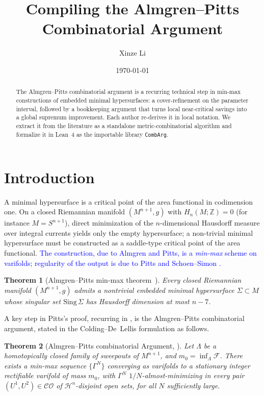 \documentclass[11pt,reqno]{amsart}
\title{Compiling the Almgren--Pitts Combinatorial Argument}
\author{Xinze Li}
\date{\today}
\newcommand{\me}[1]{\textcolor{blue}{#1}}
\newtheorem{theorem}{Theorem}[section]
\theoremstyle{definition}
\newcommand{\CombArg}{\texttt{CombArg}}
\begin{document}
\begin{abstract}
The Almgren--Pitts combinatorial argument is a recurring
technical step in min-max constructions of embedded minimal
hypersurfaces: a cover-refinement on the parameter interval,
followed by a bookkeeping argument that turns local near-critical
savings into a global supremum improvement. Each author
re-derives it in local notation. We extract it from the
literature as a standalone metric-combinatorial algorithm and
formalize it in Lean~4 as the importable library \CombArg.
\end{abstract}

\maketitle

\section{Introduction}
\label{sec:intro}

A minimal hypersurface is a critical point of the area functional
in codimension one. On a closed Riemannian manifold
$(M^{n+1}, g)$ with $H_n(M;\mathbb{Z}) = 0$ (for instance
$M = S^{n+1}$), direct minimization of the $n$-dimensional
Hausdorff measure over integral currents yields only the empty
hypersurface; a non-trivial minimal hypersurface must be
constructed as a saddle-type critical point of the area
functional. \me{The construction, due to Almgren and Pitts, is a
\emph{min-max} scheme on varifolds; regularity of the output is
due to Pitts \cite{Pit81} and Schoen--Simon \cite{SS81}.}

\begin{theorem}[Almgren--Pitts min-max theorem~\cite{Pit81,SS81}]
\label{thm:minmax}
Every closed Riemannian manifold $(M^{n+1}, g)$ admits a
nontrivial embedded minimal hypersurface $\Sigma \subset M$ whose
singular set $\mathrm{Sing}\,\Sigma$ has Hausdorff dimension at
most $n - 7$.
\end{theorem}

A key step in Pitts's proof, recurring in
\cite{CDL03,DLT13,DLR17,DL12,MN14}, is the Almgren--Pitts
combinatorial argument, stated in the Colding--De~Lellis
formulation as follows.

\begin{theorem}[Almgren--Pitts combinatorial Argument,
{\cite[Prop.~3.4]{CDL03}}]
\label{thm:AP-combinatorial}
Let $\Lambda$ be a homotopically closed family of sweepouts of
$M^{n+1}$, and $m_0 = \inf_\Lambda \mathcal{F}$. There exists a
min-max sequence $\{\Gamma^N\}$ converging as varifolds to a
stationary integer rectifiable varifold of mass $m_0$, with
$\Gamma^N$
$1/N$-almost-minimizing in every pair
$(U^1, U^2) \in \mathcal{CO}$ of $\mathcal{H}^n$-disjoint open
sets, for all $N$ sufficiently large.
\end{theorem}
\end{document}
